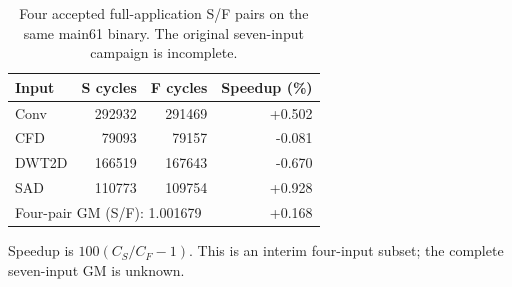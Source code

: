 \begin{table}[t]
\centering
\caption{Four accepted full-application S/F pairs on the same main61 binary. The original seven-input campaign is incomplete.}
\label{tab:epl2-four-interim}
\begin{tabular}{lrrr}
\hline
Input & S cycles & F cycles & Speedup (\%) \\
\hline
Conv & 292932 & 291469 & +0.502 \\
CFD & 79093 & 79157 & -0.081 \\
DWT2D & 166519 & 167643 & -0.670 \\
SAD & 110773 & 109754 & +0.928 \\
\hline
\multicolumn{3}{l}{Four-pair GM (S/F): 1.001679} & +0.168 \\
\hline
\end{tabular}

{\footnotesize Speedup is $100(C_S/C_F-1)$. This is an interim four-input subset; the complete seven-input GM is unknown.}
\end{table}
